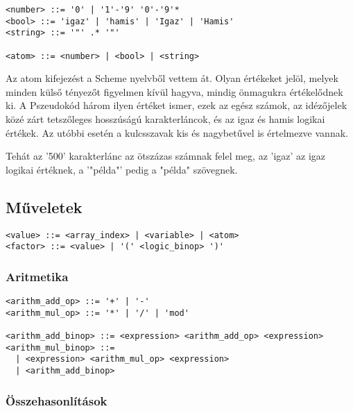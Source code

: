\begin{footnotesize}
\begin{verbatim}
<number> ::= '0' | '1'-'9' '0'-'9'*
<bool> ::= 'igaz' | 'hamis' | 'Igaz' | 'Hamis'
<string> ::= '"' .* '"'

<atom> ::= <number> | <bool> | <string>
\end{verbatim}
\end{footnotesize}

Az atom kifejezést a Scheme nyelvből vettem át. Olyan értékeket jelöl, melyek minden külső tényezőt figyelmen kívül hagyva, mindig önmagukra értékelődnek ki. A Pszeudokód három ilyen értéket ismer, ezek az egész számok, az idézőjelek közé zárt tetszőleges hosszúságú karakterláncok, és az igaz és hamis logikai értékek. Az utóbbi esetén a kulcsszavak kis és nagybetűvel is értelmezve vannak.

Tehát az '500' karakterlánc az ötszázas számnak felel meg, az 'igaz' az igaz logikai értéknek, a '"példa"' pedig a "példa" szövegnek.

\subsection{Műveletek}

\begin{footnotesize}
\begin{verbatim}
<value> ::= <array_index> | <variable> | <atom>
<factor> ::= <value> | '(' <logic_binop> ')'
\end{verbatim}
\end{footnotesize}

\subsubsection{Aritmetika}

\begin{footnotesize}
\begin{verbatim}
<arithm_add_op> ::= '+' | '-'
<arithm_mul_op> ::= '*' | '/' | 'mod'

<arithm_add_binop> ::= <expression> <arithm_add_op> <expression>
<arithm_mul_binop> ::= 
  | <expression> <arithm_mul_op> <expression> 
  | <arithm_add_binop>
\end{verbatim}
\end{footnotesize}

\subsubsection{Összehasonlítások}


